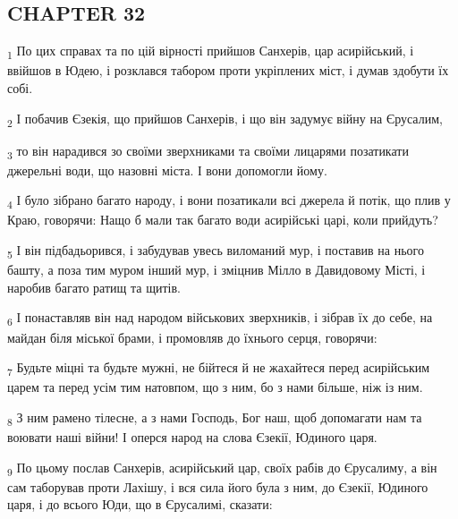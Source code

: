 \subsection{CHAPTER 32}
\begin{tcolorbox}
\textsubscript{1} По цих справах та по цій вірності прийшов Санхерів, цар асирійський, і ввійшов в Юдею, і розклався табором проти укріплених міст, і думав здобути їх собі.
\end{tcolorbox}
\begin{tcolorbox}
\textsubscript{2} І побачив Єзекія, що прийшов Санхерів, і що він задумує війну на Єрусалим,
\end{tcolorbox}
\begin{tcolorbox}
\textsubscript{3} то він нарадився зо своїми зверхниками та своїми лицарями позатикати джерельні води, що назовні міста. І вони допомогли йому.
\end{tcolorbox}
\begin{tcolorbox}
\textsubscript{4} І було зібрано багато народу, і вони позатикали всі джерела й потік, що плив у Краю, говорячи: Нащо б мали так багато води асирійські царі, коли прийдуть?
\end{tcolorbox}
\begin{tcolorbox}
\textsubscript{5} І він підбадьорився, і забудував увесь виломаний мур, і поставив на нього башту, а поза тим муром інший мур, і зміцнив Мілло в Давидовому Місті, і наробив багато ратищ та щитів.
\end{tcolorbox}
\begin{tcolorbox}
\textsubscript{6} І понаставляв він над народом військових зверхників, і зібрав їх до себе, на майдан біля міської брами, і промовляв до їхнього серця, говорячи:
\end{tcolorbox}
\begin{tcolorbox}
\textsubscript{7} Будьте міцні та будьте мужні, не бійтеся й не жахайтеся перед асирійським царем та перед усім тим натовпом, що з ним, бо з нами більше, ніж із ним.
\end{tcolorbox}
\begin{tcolorbox}
\textsubscript{8} З ним рамено тілесне, а з нами Господь, Бог наш, щоб допомагати нам та воювати наші війни! І оперся народ на слова Єзекії, Юдиного царя.
\end{tcolorbox}
\begin{tcolorbox}
\textsubscript{9} По цьому послав Санхерів, асирійський цар, своїх рабів до Єрусалиму, а він сам таборував проти Лахішу, і вся сила його була з ним, до Єзекії, Юдиного царя, і до всього Юди, що в Єрусалимі, сказати:
\end{tcolorbox}
